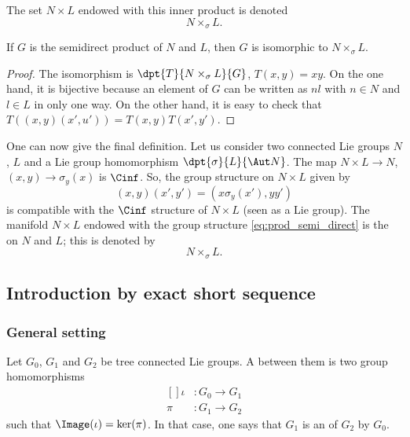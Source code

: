 The set $N\times L$ endowed with this inner product is denoted
\[
	N\times_{\sigma}L.
\]

\begin{proposition}
	If $G$ is the semidirect product of $N$ and $L$, then $G$ is isomorphic to $N\times_{\sigma} L$.
\end{proposition}

\begin{proof}
	The isomorphism is $\dpt{T}{N\times_{\sigma}L}{G}$, $T(x,y)=xy$. On the one hand, it is bijective because an element of $G$ can be written as $nl$ with $n\in N$ and $l\in L$ in only one way. On the other hand, it is easy to check that $T( (x,y)(x',u') )=T(x,y)T(x',y')$.
\end{proof}

One can now give the final definition. Let us consider two connected Lie groups $N$, $L$ and a Lie group  homomorphism $\dpt{\sigma}{L}{\Aut N}$. The map $N\times L\to N$, $(x,y)\to\sigma_y(x)$ is $\Cinf$. So, the group structure on $N\times L$ given by
\begin{equation}\label{eq:prod_semi_direct}
	(x,y)(x',y')=(x\sigma_y(x'),yy')
\end{equation}
is compatible with the $\Cinf$ structure of $N\times L$ (seen as a Lie group). The manifold $N\times L$ endowed with the group structure \eqref{eq:prod_semi_direct} is the  on $N$ and $L$; this is denoted by
\[
	N\times_{\sigma}L.
\]

\subsection{Introduction by exact short sequence}

\subsubsection{General setting}

Let $G_0$, $G_1$ and $G_2$ be tree connected Lie groups. A  between them is two group homomorphisms
\begin{equation}
	\begin{aligned}[]
		\iota & \colon G_0\to G_1 \\
		\pi   & \colon G_1\to G_2
	\end{aligned}
\end{equation}
such that $\Image(\iota)=\ker(\pi)$. In that case, one says that $G_1$ is an  of $G_2$ by $G_0$.

